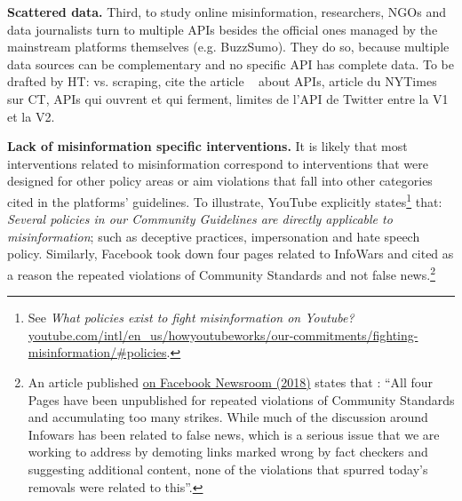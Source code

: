 \documentclass{article}
\begin{document}
\smallskip

{\bf Scattered data.} Third, to study online misinformation, researchers, NGOs and data journalists turn to multiple APIs besides the official ones managed by the mainstream platforms themselves (e.g. BuzzSumo). They do so, because multiple data sources can be complementary and no specific API has complete data. {\color{pink} To be drafted by HT:  vs. scraping, cite the article ~\cite{api} about APIs, article du NYTimes sur CT, APIs qui ouvrent et qui ferment, limites de l'API de Twitter entre la V1 et la V2.}


{\bf Lack of misinformation specific interventions.} It is likely that most interventions related to misinformation correspond to interventions that were designed for other policy areas or aim violations that fall into other categories cited in the platforms' guidelines. To illustrate, YouTube explicitly states\footnote{See {\it What policies exist to fight misinformation on Youtube?} \href{https://www.youtube.com/intl/en\_us/howyoutubeworks/our-commitments/fighting-misinformation/\#policies}{youtube.com/intl/en\_us/howyoutubeworks/our-commitments/fighting-misinformation/\#policies}.} that: {\it Several policies in our Community Guidelines are directly applicable to misinformation}; such as deceptive practices, impersonation and hate speech policy. Similarly, Facebook took down four pages related to InfoWars and cited as a reason the repeated violations of Community Standards and not false news.\footnote{An article published \href{https://about.fb.com/news/2018/08/enforcing-our-community-standards/}{on Facebook Newsroom (2018)} states that : ``All four Pages have been unpublished for repeated violations of Community Standards and accumulating too many strikes. While much of the discussion around Infowars has been related to false news, which is a serious issue that we are working to address by demoting links marked wrong by fact checkers and suggesting additional content, none of the violations that spurred today’s removals were related to this''.}
\end{document}

